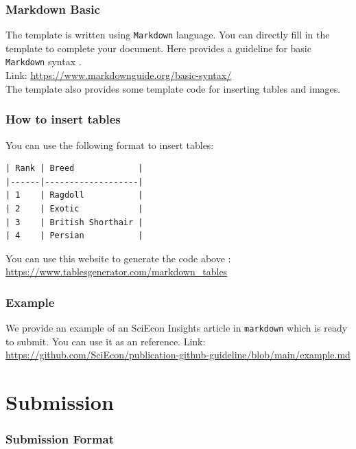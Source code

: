 \documentclass{beamer}
\begin{document}
\begin{frame}
\frametitle{Markdown Basic}

The template is written using \texttt{Markdown} language. You can directly fill in the template to complete your document.
\vspace{.5em}
Here provides a guideline for basic \texttt{Markdown} syntax \cite{noauthor_basic_nodate}.\\
\vspace{.5em}
Link: \url{https://www.markdownguide.org/basic-syntax/}\\
\vspace{.5em}
The template also provides some template code for inserting tables and images.

\end{frame}

\begin{frame}[fragile]
    \frametitle{How to insert tables}

    You can use the following format to insert tables:

    \begin{lstlisting}
| Rank | Breed             |
|------|-------------------|
| 1    | Ragdoll           |
| 2    | Exotic            |
| 3    | British Shorthair |
| 4    | Persian           |
    \end{lstlisting}
    You can use this website to generate the code above \cite{noauthor_markdown_nodate}:\\
    \url{https://www.tablesgenerator.com/markdown_tables}

\end{frame}

\begin{frame}
    \frametitle{Example}

    We provide an example of an SciEcon Insights article in \texttt{markdown} which is ready to submit. You can use it as an reference.
    \vspace{1em}
    Link: \url{https://github.com/SciEcon/publication-github-guideline/blob/main/example.md}

\end{frame}

\section{Submission}

\begin{frame}
    \frametitle{Submission Format}

    

\end{frame}
\end{document}
